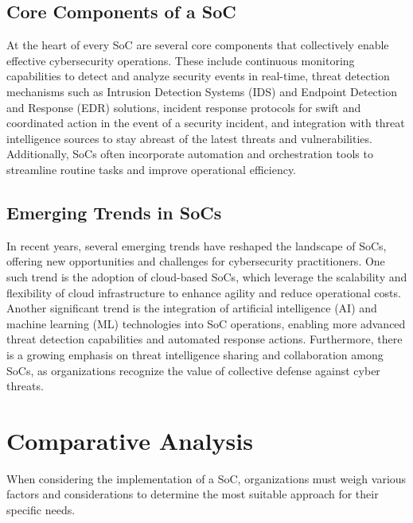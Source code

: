 \subsection{Core Components of a SoC}
At the heart of every SoC are several core components that collectively enable effective cybersecurity operations.
These include continuous monitoring capabilities to detect and analyze security events in real-time, threat detection mechanisms such as Intrusion Detection Systems (IDS) and Endpoint Detection and Response (EDR) solutions, incident response protocols for swift and coordinated action in the event of a security incident, and integration with threat intelligence sources to stay abreast of the latest threats and vulnerabilities.
Additionally, SoCs often incorporate automation and orchestration tools to streamline routine tasks and improve operational efficiency.

\subsection{Emerging Trends in SoCs}
In recent years, several emerging trends have reshaped the landscape of SoCs, offering new opportunities and challenges for cybersecurity practitioners.
One such trend is the adoption of cloud-based SoCs, which leverage the scalability and flexibility of cloud infrastructure to enhance agility and reduce operational costs.
Another significant trend is the integration of artificial intelligence (AI) and machine learning (ML) technologies into SoC operations, enabling more advanced threat detection capabilities and automated response actions.
Furthermore, there is a growing emphasis on threat intelligence sharing and collaboration among SoCs, as organizations recognize the value of collective defense against cyber threats.

\section{Comparative Analysis}
When considering the implementation of a SoC, organizations must weigh various factors and considerations to determine the most suitable approach for their specific needs.

